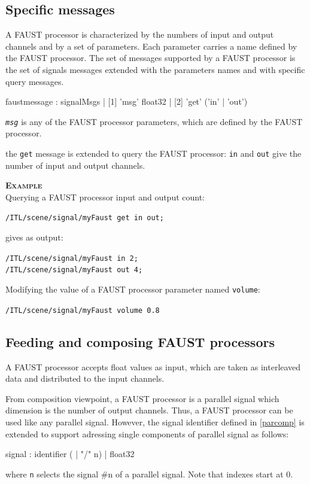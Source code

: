 \documentclass[a4paper,twoside]{report}
\newcommand{\subsublevel}[1]	{\subsection{#1}}
\newcommand{\OSC}[1]		{\texttt{#1}}
\newcommand{\values}[1]		{\texttt{#1}}
\newcommand{\example}		{\textbf{\hspace{-1.5cm}\textbf{\textsc{Example }}}}
\let\olditemize\itemize
\let\oldenditemize\enditemize
\renewenvironment{itemize} 	{\olditemize \setlength{\itemsep}{1mm}}{\oldenditemize}
\newcommand{\sample}	[1]			{\vspace{-2mm}\begin{center}\colorbox{mygrey}{
								\begin{minipage}[t]{0.9\columnwidth} 
								{\small \texttt{#1}}
								\end{minipage}}\end{center}}
\newcommand{\sampleindent}	{ \hspace{0.5cm} }
\begin{document}
\subsublevel{Specific messages}
\label{faustmsg}
A FAUST processor is characterized by the numbers of input and output channels and by a set of parameters. Each parameter carries a name defined by the FAUST processor. The set of messages supported by a FAUST processor is the set of signals messages extended with the parameters names and with specific query messages. 

\begin{rail}
faustmessage : signalMsgs
			 | [1] 'msg' float32
			 | [2] 'get' ('in' | 'out')
\end{rail}

\begin{itemize}
\item [1] \OSC{\emph{msg}} is any of the FAUST processor parameters, which are defined by the FAUST processor.
\item [2] the \OSC{get} message is extended to query the FAUST processor: \OSC{in} and \OSC{out} give the number of input and output channels.
\end{itemize}

\example \\
Querying a FAUST processor input and output count:
\sample{/ITL/scene/signal/myFaust get in out;}
\sampleindent gives as output:
\sample{/ITL/scene/signal/myFaust in 2; \\
/ITL/scene/signal/myFaust out 4;
}
Modifying the value of a FAUST processor parameter named \OSC{volume}:
\sample{/ITL/scene/signal/myFaust volume 0.8}

\subsublevel{Feeding and composing FAUST processors}
\label{composefaust}

A FAUST processor accepts float values as input, which are taken as interleaved data and distributed to the input channels.

From composition viewpoint, a FAUST processor is a parallel signal which dimension is the number of output channels. 
Thus, a FAUST processor can be used like any parallel signal. However, the signal identifier defined in \ref{parcomp} is extended to support adressing single components of parallel signal as follows:
\begin{rail}
signal :  
		  identifier ( | "/" n)
		| float32
\end{rail}
where \values{n} selects the signal \#n of a parallel signal. Note that indexes start at 0.
\end{document}

